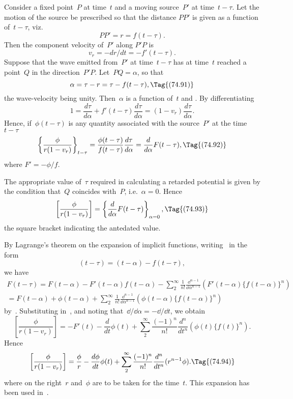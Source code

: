\documentclass[12pt]{book}
\begin{document}
Consider a fixed point~$P$ at time~$t$ and a moving source~$P'$ at time~$t-\tau$.
Let the motion of the source be prescribed so that the distance $PP'$ is given as a function of~$t-\tau$, viz.
\[
PP' = r = f(t-\tau).
\]
Then the component velocity of~$P'$ along $P'P$ is
\[
v_r = -dr/dt = -f'(t-\tau).
\]
Suppose that the wave emitted from~$P'$ at time~$t-\tau$ has at time~$t$ reached a point~$Q$ in the direction~$P'P$.
Let~$PQ=\alpha$, so that
\[
\alpha = \tau - r = \tau - f(t-\tau),
\Tag{(74.91)}
\]
the wave-velocity being unity.
Then~$\alpha$ is a function of~$t$ and .
By differentiating~
\[
1 = \frac{d\tau}{d\alpha} + f'(t-\tau)\frac{d\tau}{d\alpha} = (1-v_r)\frac{d\tau}{d\alpha}.
\]
Hence, if~$\phi(t-\tau)$ is any quantity associated with the source~$P'$ at the time~$t-\tau$
\[
\left\{ \frac{\phi}{r(1-v_r)} \right\}_{t-\tau} = \frac{\phi(t-\tau)}{f(t-\tau)}\frac{d\tau}{d\alpha}=\frac{d}{d\alpha}F(t-\tau),
\Tag{(74.92)}
\]
where $F'=-\phi/f$.

The appropriate value of~$\tau$ required in calculating a retarded potential is given by the condition that~$Q$
coincides with~$P$, i.e.~$\alpha = 0$.
Hence
\[
\left[\frac{\phi}{r(1-v_r)}\right] = \left\{\frac{d}{d\alpha}F(t-\tau)\right\}_{\alpha=0},
\Tag{(74.93)}
\]
the square bracket indicating the antedated value.

By Lagrange's theorem on the expansion of implicit functions, writing~ in the form
\[
(t-\tau) = (t-\alpha)-f(t-\tau),
\]
we have
\begin{multline*}
F(t-\tau) = F(t-\alpha) - F'(t-\alpha)f(t-\alpha) -
                \sum_2^\infty\frac{1}{n!}\frac{\dd^{n-1}}{\dd\alpha^{n-1}}(F'(t-\alpha)\{f(t-\alpha)\}^n)\\
          = F(t-\alpha) + \phi(t-\alpha) +
              \sum_2^\infty\frac{1}{n!}\frac{\dd^{n-1}}{\dd\alpha^{n-1}}(\phi(t-\alpha)\{f(t-\alpha)\}^n)
\end{multline*}
by~.
Substituting in~, and noting that~$\dd/\dd\alpha = -\dd/\dd t$, we obtain
\[
\left[\frac{\phi}{r(1-v_r)}\right]= -F'(t) - \frac{d}{dt}\phi(t) +
                                      \sum_2^\infty\frac{(-1)^n}{n!}\frac{d^n}{dt^n}(\phi(t)\{f(t)\}^n).
\]
Hence
\[
\left[\frac{\phi}{r(1-v_r)}\right]= \frac{\phi}{r} - \frac{d\phi}{dt}\phi(t) +
                                      \sum_2^\infty\frac{(-1)^n}{n!}\frac{d^n}{dt^n}(r^{n-1}\phi).
\Tag{(74.94)}
\]
where on the right~$r$ and~$\phi$ are to be taken for the time~$t$.
This expansion has been used in~.
\end{document}
